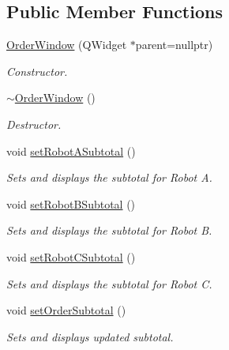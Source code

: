 \subsection*{Public Member Functions}
\begin{DoxyCompactItemize}
\item 
\mbox{\label{class_order_window_a4e93bee57fd21c5454cb0729ff43ace8}} 
\mbox{\hyperlink{class_order_window_a4e93bee57fd21c5454cb0729ff43ace8}{Order\+Window}} (Q\+Widget $\ast$parent=nullptr)
\begin{DoxyCompactList}\small\item\em Constructor. \end{DoxyCompactList}\item 
\mbox{\label{class_order_window_a127e3637720468474c85a9c4a1e150ac}} 
\mbox{\hyperlink{class_order_window_a127e3637720468474c85a9c4a1e150ac}{$\sim$\+Order\+Window}} ()
\begin{DoxyCompactList}\small\item\em Destructor. \end{DoxyCompactList}\item 
void \mbox{\hyperlink{class_order_window_a4fec739fb9e3c2c06fdf8afa7d94a4f9}{set\+Robot\+A\+Subtotal}} ()
\begin{DoxyCompactList}\small\item\em Sets and displays the subtotal for Robot A. \end{DoxyCompactList}\item 
void \mbox{\hyperlink{class_order_window_aa575a53f391f6bc103e89f2bf2fce91e}{set\+Robot\+B\+Subtotal}} ()
\begin{DoxyCompactList}\small\item\em Sets and displays the subtotal for Robot B. \end{DoxyCompactList}\item 
void \mbox{\hyperlink{class_order_window_a5283f60b1a3076038b08160b37542fdc}{set\+Robot\+C\+Subtotal}} ()
\begin{DoxyCompactList}\small\item\em Sets and displays the subtotal for Robot C. \end{DoxyCompactList}\item 
void \mbox{\hyperlink{class_order_window_a9b1e24f50bfc70c3920932f58331f917}{set\+Order\+Subtotal}} ()
\begin{DoxyCompactList}\small\item\em Sets and displays updated subtotal. \end{DoxyCompactList}\item 

\end{DoxyCompactItemize}
